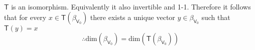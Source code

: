 \begin{enumerate}[(a)]
\paragraph{} $\mathsf{T}$ is an isomorphism. Equivalently it also
invertible and 1-1. Therefore it follows that for every $x\in
\mathsf{T}(\beta_{\mathsf{V}_0})$ there exists a unique vector $y \in
\beta_{\mathsf{V}_0}$ such that $\mathsf{T}(y) =x$
\begin{equation}
\therefore \text{dim}(\beta_{\mathsf{V}_0}) = \text{dim}(\mathsf{T}(\beta_{\mathsf{V}_0}))
\end{equation}
\end{enumerate}
